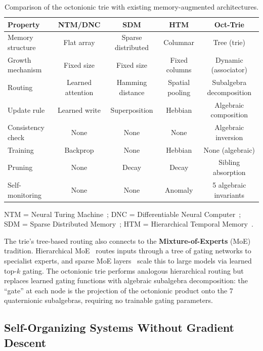 \documentclass[11pt,a4paper]{article}
\theoremstyle{definition}
\theoremstyle{remark}
\begin{document}
\begin{table}[ht]
\centering
\caption{Comparison of the octonionic trie with existing memory-augmented architectures.}
\label{tab:comparison}
\begin{tabular}{@{}lcccc@{}}
\toprule
Property & NTM/DNC & SDM & HTM & Oct-Trie \\
\midrule
Memory structure  & Flat array       & Sparse distributed & Columnar  & Tree (trie) \\
Growth mechanism  & Fixed size       & Fixed size          & Fixed columns & Dynamic (associator) \\
Routing           & Learned attention & Hamming distance   & Spatial pooling & Subalgebra decomposition \\
Update rule       & Learned write    & Superposition      & Hebbian   & Algebraic composition \\
Consistency check & None             & None                & None      & Algebraic inversion \\
Training          & Backprop         & None                & Hebbian   & None (algebraic) \\
Pruning           & None             & Decay               & Decay     & Sibling absorption \\
Self-monitoring   & None             & None                & Anomaly   & 5 algebraic invariants \\
\bottomrule
\end{tabular}
\smallskip

\noindent\footnotesize NTM = Neural Turing Machine~\citep{Graves2014}; DNC = Differentiable Neural Computer~\citep{Graves2016}; SDM = Sparse Distributed Memory~\citep{Kanerva1988}; HTM = Hierarchical Temporal Memory~\citep{Hawkins2016}.
\end{table}

The trie's tree-based routing also connects to the \textbf{Mixture-of-Experts} (MoE) tradition. Hierarchical MoE~\citep{JordanJacobs1994} routes inputs through a tree of gating networks to specialist experts, and sparse MoE layers~\citep{Shazeer2017} scale this to large models via learned top-$k$ gating. The octonionic trie performs analogous hierarchical routing but replaces learned gating functions with algebraic subalgebra decomposition: the ``gate'' at each node is the projection of the octonionic product onto the 7 quaternionic subalgebras, requiring no trainable gating parameters.

\subsection{Self-Organizing Systems Without Gradient Descent}
\end{document}
